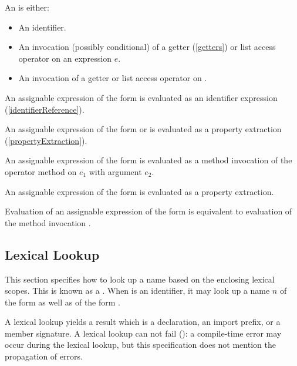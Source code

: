 \documentclass[makeidx]{article}
\begin{document}
{\LMHash{}%
An  is either:
\begin{itemize}
\item An identifier.
\item An invocation (possibly conditional) of a getter (\ref{getters}) or list access operator on an expression $e$.
\item An invocation of a getter or list access operator on \SUPER{}.
\end{itemize}

\LMHash{}%
An assignable expression of the form \id{} is evaluated as an identifier expression (\ref{identifierReference}).


\LMHash{}%
An assignable expression of the form  or  is evaluated as a property extraction (\ref{propertyExtraction}).

\LMHash{}%
An assignable expression of the form  is evaluated as a method invocation of the operator method \code{[]} on $e_1$ with argument $e_2$.

\LMHash{}%
An assignable expression of the form  is evaluated as a property extraction.

\LMHash{}%
Evaluation of an assignable expression of the form \code{\SUPER{}[$e_2$]} is equivalent to evaluation of the method invocation .


\subsection{Lexical Lookup}

\LMHash{}%
This section specifies how to look up a name
based on the enclosing lexical scopes.
This is known as a .
When \id{} is an identifier,
it may look up a name $n$ of the form \id{} as well as of the form \code{\id=}.

\LMHash{}%
A lexical lookup yields a result which is
a declaration, an import prefix, or a member signature.
A lexical lookup can not fail
():
a compile-time error may occur during the lexical lookup,
but this specification does not mention the propagation of errors.


}
\end{document}
